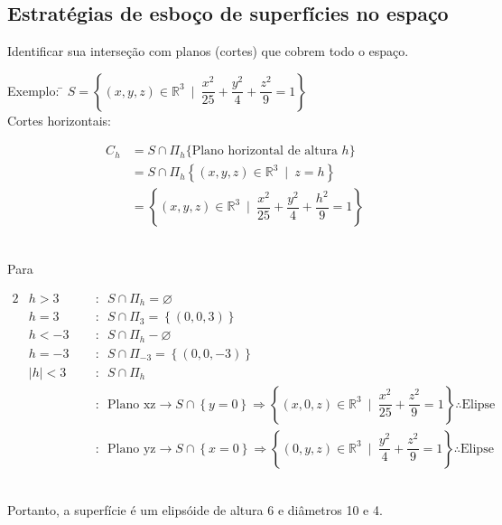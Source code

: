 \documentclass{article}
\begin{document}
\subsection{Estratégias de esboço de superfícies no espaço}
Identificar sua interseção com planos (cortes) que cobrem todo o espaço. \\[-10pt]
\begin{tabbing}
  Exemplo: \= $S = \left\{ (x, y, z) \in \mathbb{R}^3 \enspace \bigg| \enspace \dfrac{x^2}{25} + \dfrac{y^2}{4} + \dfrac{z^2}{9} = 1 \right\}$ \\[5pt]
  \> Cortes horizontais: \\[-5pt]
  \>\begin{minipage}{.5 \textwidth}
    \begin{align*}
      C_h &= S \cap \Pi_h\{ \text{Plano horizontal de altura $h$} \} \\
      &= S \cap \Pi_h\left\{ (x, y, z) \in \mathbb{R}^3 \enspace \big| \enspace z = h \right\} \\
      &= \left\{ (x, y, z) \in \mathbb{R}^3 \enspace \bigg| \enspace \dfrac{x^2}{25} + \dfrac{y^2}{4} + \dfrac{h^2}{9} = 1 \right\}
    \end{align*}
  \end{minipage}\\
  \> Para\\[-10pt]
  \>\quad\begin{minipage}{.35 \textwidth}
    \begin{alignat*}{2}
      &h > 3   \enspace &&: \enspace S \cap \Pi_h = \varnothing \\[5pt]
      &h = 3   \enspace &&: \enspace S \cap \Pi_3 = \left\{ (0,0,3) \right\} \\[5pt]
      &h < -3  \enspace &&: \enspace S \cap \Pi_h - \varnothing \\[5pt]
      &h = -3  \enspace &&: \enspace S \cap \Pi_{-3} = \left\{ (0,0,-3) \right\} \\[5pt]
      &|h| < 3 \enspace &&: \enspace S \cap \Pi_h \\[-5pt]
      & &&: \enspace \text{Plano xz} \rightarrow S \cap \left\{ y = 0 \right\} \Rightarrow \left\{ (x, 0, z) \in \mathbb{R}^3 \enspace \bigg| \enspace \dfrac{x^2}{25} + \dfrac{z^2}{9} = 1 \right\} \therefore \text{Elipse} \\
      & &&: \enspace \text{Plano yz} \rightarrow S \cap \left\{ x = 0 \right\} \Rightarrow \left\{ (0, y, z) \in \mathbb{R}^3 \enspace \bigg| \enspace \dfrac{y^2}{4} + \dfrac{z^2}{9} = 1 \right\} \therefore \text{Elipse}
    \end{alignat*}
  \end{minipage}\\[10pt]
  \> Portanto, a superfície é um elipsóide de altura 6 e diâmetros 10 e 4.
\end{tabbing}
\end{document}
